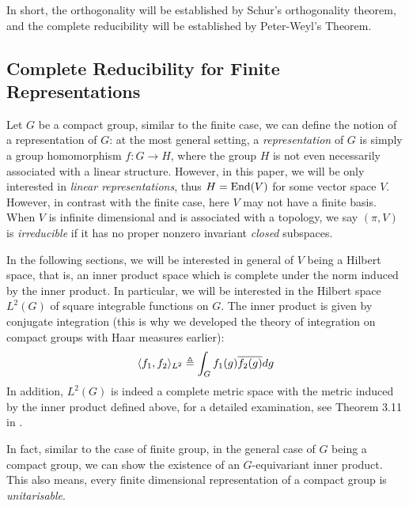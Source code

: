 In short, the orthogonality will be established by Schur's orthogonality
theorem, and the complete reducibility will be established by Peter-Weyl's
Theorem. 



\subsection{Complete Reducibility for Finite Representations}

Let $G$ be a compact group, similar to the finite case, we can define the notion
of a representation of $G$:  at the most general setting, a
\emph{representation} of $G$ is simply a group homomorphism $f : G \to H$, where
the group $H$ is not even necessarily associated with a linear structure.
However, in this paper, we will be only interested in \emph{linear
  representations}, thus $H = \operatorname{End}(V)$ for some vector space $V$.  However, in
contrast with the finite case, here $V$ may not have a finite basis.  When $V$
is infinite dimensional and is associated with a topology, we say $(\pi,V)$ is
\emph{irreducible} if it has no proper nonzero invariant \emph{closed}
subspaces.

In the following sections, we will be interested in general of $V$ being a
Hilbert space, that is, an inner product space which is complete under the norm
induced by the inner product. In particular, we will be interested in the
Hilbert space $L^2(G)$ of square integrable functions on $G$. The inner product
is given by conjugate integration (this is why we developed the theory of
integration on compact groups with Haar measures earlier):
\begin{equation} \label{Hilbert-inner-product}
  \langle f_1 , f_2 \rangle_{L^2} \triangleq \int_G f_1(g) \overline{f_2(g)} dg
\end{equation}
In addition, $L^2(G)$ is indeed a complete metric space with the metric induced
by the inner product defined above, for a detailed examination, see Theorem 3.11
in \cite{rudin1987real}.

In fact, similar to the case of finite group, in the general case of $G$ being a
compact group, we can show the existence of an $G$-equivariant inner product.
This also means, every finite dimensional representation of a compact group is
\emph{unitarisable}.

